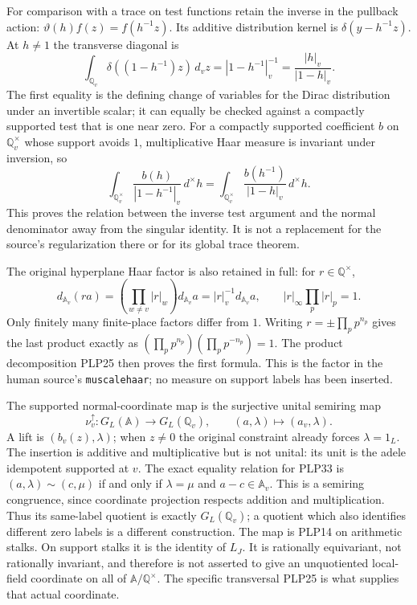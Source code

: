 For comparison with a trace on test functions retain the inverse
in the pullback action:
$\vartheta(h)f(z)=f(h^{-1}z)$. Its additive distribution kernel is
$\delta(y-h^{-1}z)$. At $h\ne1$ the transverse diagonal is
\begin{equation}\tag{PLP30}
\int_{\mathbb Q_v}\delta((1-h^{-1})z)\,d_vz
=|1-h^{-1}|_v^{-1}
=\frac{|h|_v}{|1-h|_v}.
\end{equation}
The first equality is the defining change of variables for
the Dirac distribution under an invertible scalar; it can
equally be checked against a compactly supported test that is
one near zero. For a compactly supported coefficient $b$ on
$\mathbb Q_v^\times$ whose support avoids $1$, multiplicative
Haar measure is invariant under inversion, so
\begin{equation}\tag{PLP31}
\int_{\mathbb Q_v^\times}
\frac{b(h)}{|1-h^{-1}|_v}\,d^\times h
=
\int_{\mathbb Q_v^\times}
\frac{b(h^{-1})}{|1-h|_v}\,d^\times h .
\end{equation}
This proves the relation between the inverse test argument and the
normal denominator away from the singular identity. It is not a
replacement for the source's regularization there or for its
global trace theorem.

The original hyperplane Haar factor is also retained in full:
for $r\in\mathbb Q^\times$,
\begin{equation}\tag{PLP32}
d_{\mathbb A_v}(ra)
=\left(\prod_{w\ne v}|r|_w\right)d_{\mathbb A_v}a
=|r|_v^{-1}d_{\mathbb A_v}a,\qquad
|r|_\infty\prod_p|r|_p=1 .
\end{equation}
Only finitely many finite-place factors differ from $1$.
Writing $r=\pm\prod_p p^{n_p}$ gives the last product exactly
as $(\prod_p p^{n_p})(\prod_p p^{-n_p})=1$.
The product decomposition PLP25 then proves the first formula.
This is the factor in the human source's \texttt{muscalehaar};
no measure on support labels has been inserted.

The supported normal-coordinate map is the surjective unital
semiring map
\begin{equation}\tag{PLP33}
\nu_v^\uparrow:G_L(\mathbb A)\longrightarrow G_L(\mathbb Q_v),
\qquad (a,\lambda)\longmapsto(a_v,\lambda).
\end{equation}
A lift is $(b_v(z),\lambda)$; when $z\ne0$ the original constraint
already forces $\lambda=1_L$. The insertion is additive and
multiplicative but is not unital: its unit is the adele idempotent
supported at $v$. The exact equality relation for PLP33 is
$(a,\lambda)\sim(c,\mu)$ if and only if
$\lambda=\mu$ and $a-c\in\mathbb A_v$.
This is a semiring congruence, since coordinate projection
respects addition and multiplication. Thus its same-label
quotient is exactly $G_L(\mathbb Q_v)$; a quotient which also
identifies different zero labels is a different construction.
The map is PLP14 on arithmetic stalks. On support stalks it is
the identity of $L_J$. It is rationally equivariant, not
rationally invariant, and therefore is not asserted to give
an unquotiented local-field coordinate on all of
$\mathbb A/\mathbb Q^\times$. The specific transversal PLP25
is what supplies that actual coordinate.

